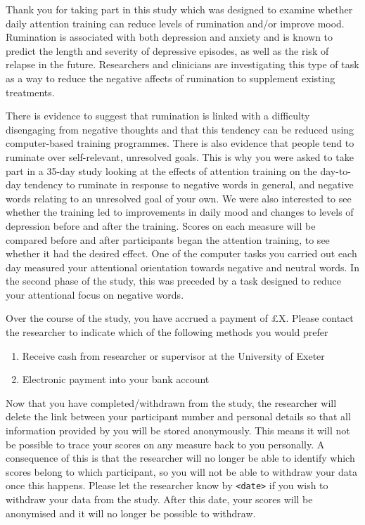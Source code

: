 Thank you for taking part in this study which was designed to examine
whether daily attention training can reduce levels of rumination and/or
improve mood. Rumination is associated with both depression and anxiety
and is known to predict the length and severity of depressive episodes,
as well as the risk of relapse in the future. Researchers and clinicians
are investigating this type of task as a way to reduce the negative
affects of rumination to supplement existing treatments.

There is evidence to suggest that rumination is linked with a difficulty
disengaging from negative thoughts and that this tendency can be reduced
using computer-based training programmes. There is also evidence that
people tend to ruminate over self-relevant, unresolved goals. This is why
you were asked to take part in a 35-day study looking at the effects of
attention training on the day-to-day tendency to ruminate in response to
negative words in general, and negative words relating to an unresolved
goal of your own. We were also interested to see whether the training led
to improvements in daily mood and changes to levels of depression before
and after the training. Scores on each measure will be compared before
and after participants began the attention training, to see whether it
had the desired effect.  One of the computer tasks you carried out each
day measured your attentional orientation towards negative and neutral
words. In the second phase of the study, this was preceded by a task
designed to reduce your attentional focus on negative words.

Over the course of the study, you have accrued a payment of \pounds{X}. Please
contact the researcher to indicate which of the following methods you
would prefer

\begin{enumerate}
  \item Receive cash from researcher or supervisor at the University of Exeter
  \item Electronic payment into your bank account
\end{enumerate}

Now that you have completed/withdrawn from the study, the researcher will
delete the link between your participant number and personal details so
that all information provided by you will be stored anonymously. This
means it will not be possible to trace your scores on any measure back
to you personally. A consequence of this is that the researcher will
no longer be able to identify which scores belong to which participant,
so you will not be able to withdraw your data once this happens. Please
let the researcher know by \texttt{<date>} if you wish to withdraw your
data from the study.  After this date, your scores will be anonymised
and it will no longer be possible to withdraw.

